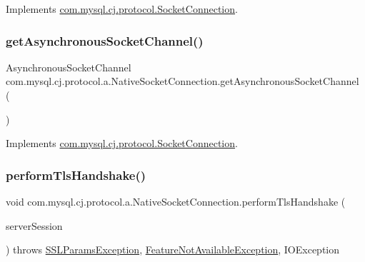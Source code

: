 Implements \mbox{\hyperlink{interfacecom_1_1mysql_1_1cj_1_1protocol_1_1_socket_connection_ac20aea608e999684c82a0dbaaa5886c7}{com.\+mysql.\+cj.\+protocol.\+Socket\+Connection}}.

\mbox{\label{classcom_1_1mysql_1_1cj_1_1protocol_1_1a_1_1_native_socket_connection_a2c48d7701f27174e67e79cee1deb78d1}} 
\subsubsection{\texorpdfstring{get\+Asynchronous\+Socket\+Channel()}{getAsynchronousSocketChannel()}}
{\footnotesize\ttfamily Asynchronous\+Socket\+Channel com.\+mysql.\+cj.\+protocol.\+a.\+Native\+Socket\+Connection.\+get\+Asynchronous\+Socket\+Channel (\begin{DoxyParamCaption}{ }\end{DoxyParamCaption})}



Implements \mbox{\hyperlink{interfacecom_1_1mysql_1_1cj_1_1protocol_1_1_socket_connection_acab5267ec9b4013b52015a1d9097066b}{com.\+mysql.\+cj.\+protocol.\+Socket\+Connection}}.

\mbox{\label{classcom_1_1mysql_1_1cj_1_1protocol_1_1a_1_1_native_socket_connection_a00e90b14ed518b12733a936a3b707134}} 
\subsubsection{\texorpdfstring{perform\+Tls\+Handshake()}{performTlsHandshake()}}
{\footnotesize\ttfamily void com.\+mysql.\+cj.\+protocol.\+a.\+Native\+Socket\+Connection.\+perform\+Tls\+Handshake (\begin{DoxyParamCaption}\item[{\mbox{\hyperlink{interfacecom_1_1mysql_1_1cj_1_1protocol_1_1_server_session}{Server\+Session}}}]{server\+Session }\end{DoxyParamCaption}) throws \mbox{\hyperlink{classcom_1_1mysql_1_1cj_1_1exceptions_1_1_s_s_l_params_exception}{S\+S\+L\+Params\+Exception}}, \mbox{\hyperlink{classcom_1_1mysql_1_1cj_1_1exceptions_1_1_feature_not_available_exception}{Feature\+Not\+Available\+Exception}}, I\+O\+Exception}



